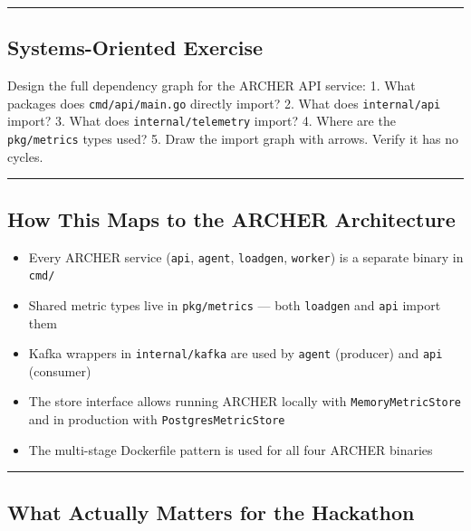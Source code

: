 \documentclass[
]{article}
\providecommand{\tightlist}{%
  \setlength{\itemsep}{0pt}\setlength{\parskip}{0pt}}
\begin{document}
\begin{center}\rule{0.5\linewidth}{0.5pt}\end{center}

\hypertarget{systems-oriented-exercise-1}{%
\subsection{Systems-Oriented
Exercise}\label{systems-oriented-exercise-1}}

Design the full dependency graph for the ARCHER API service: 1. What
packages does \texttt{cmd/api/main.go} directly import? 2. What does
\texttt{internal/api} import? 3. What does \texttt{internal/telemetry}
import? 4. Where are the \texttt{pkg/metrics} types used? 5. Draw the
import graph with arrows. Verify it has no cycles.

\begin{center}\rule{0.5\linewidth}{0.5pt}\end{center}

\hypertarget{how-this-maps-to-the-archer-architecture-1}{%
\subsection{How This Maps to the ARCHER
Architecture}\label{how-this-maps-to-the-archer-architecture-1}}

\begin{itemize}
\tightlist
\item
  Every ARCHER service (\texttt{api}, \texttt{agent}, \texttt{loadgen},
  \texttt{worker}) is a separate binary in \texttt{cmd/}
\item
  Shared metric types live in \texttt{pkg/metrics} --- both
  \texttt{loadgen} and \texttt{api} import them
\item
  Kafka wrappers in \texttt{internal/kafka} are used by \texttt{agent}
  (producer) and \texttt{api} (consumer)
\item
  The store interface allows running ARCHER locally with
  \texttt{MemoryMetricStore} and in production with
  \texttt{PostgresMetricStore}
\item
  The multi-stage Dockerfile pattern is used for all four ARCHER
  binaries
\end{itemize}

\begin{center}\rule{0.5\linewidth}{0.5pt}\end{center}

\hypertarget{what-actually-matters-for-the-hackathon-1}{%
\subsection{What Actually Matters for the
Hackathon}\label{what-actually-matters-for-the-hackathon-1}}
\end{document}
